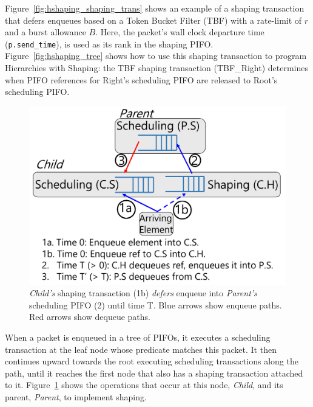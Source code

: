 

Figure~\ref{fig:hshaping_shaping_trans} shows an example of a shaping
transaction that defers enqueues based on a Token Bucket Filter (TBF)
with a rate-limit of $r$ and a burst allowance $B$. Here, the packet's
wall clock departure time ({\tt p.send\_time}), is used as its rank in
the shaping PIFO. Figure~\ref{fig:hshaping_tree} shows how to use this
shaping transaction to program Hierarchies with Shaping: the TBF
shaping transaction (TBF\_Right) determines when PIFO references for
Right's scheduling PIFO are released to Root's scheduling PIFO.

\begin{figure}[!t]
  \centering
  \includegraphics[width=0.6\columnwidth]{pifo_shaping_semantics.pdf}
  \caption{\textit{Child's} shaping transaction (1b) {\em defers} enqueue
  into \textit{Parent's} scheduling PIFO (2) until time T.  Blue arrows
  show enqueue paths. Red arrows show dequeue paths.  }
  \label{fig:shaping_trans}
\end{figure}

When a packet is enqueued in a tree of PIFOs, it executes a scheduling
transaction at the leaf node whose predicate matches this packet.  It
then continues upward towards the root executing scheduling
transactions along the path, until it reaches the first node that also
has a shaping transaction attached to
it. Figure~\ref{fig:shaping_trans} shows the operations that occur at
this node, {\em Child}, and its parent, {\em Parent}, to implement
shaping.

